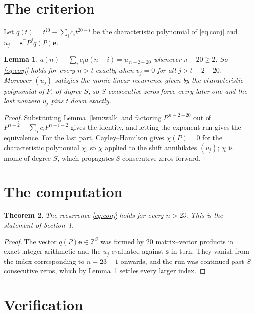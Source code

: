\documentclass[11pt,a4paper]{article}
\theoremstyle{plain}
\newtheorem{theorem}{Theorem}
\newtheorem{lemma}[theorem]{Lemma}
\theoremstyle{definition}
\begin{document}
\section{The criterion}

Let $q(t)=t^{20}-\sum_i c_i t^{20-i}$ be the characteristic polynomial of
\eqref{eq:conj} and $u_j=\mathbf{s}^{\!\top}P^{j}q(P)\mathbf{e}$.

\begin{lemma}\label{lem:crit}
$a(n)-\sum_i c_i a(n-i)=u_{\,n-2-20}$ whenever $n-20\ge2$. So \eqref{eq:conj}
holds for every $n>t$ exactly when $u_j=0$ for all $j>t-2-20$. Moreover $(u_j)$
satisfies the monic linear recurrence given by the characteristic polynomial of $P$, of
degree $S$, so $S$ consecutive zeros force every later one and the last nonzero $u_j$ pins
$t$ down exactly.
\end{lemma}

\begin{proof}
Substituting Lemma~\ref{lem:walk} and factoring $P^{\,n-2-20}$ out of
$P^{n-2}-\sum_i c_i P^{n-i-2}$ gives the identity, and letting the exponent run gives the
equivalence. For the last part, Cayley--Hamilton gives $\chi(P)=0$ for the characteristic
polynomial $\chi$, so $\chi$ applied to the shift annihilates $(u_j)$; $\chi$ is monic of
degree $S$, which propagates $S$ consecutive zeros forward.
\end{proof}

\section{The computation}

\begin{theorem}
The recurrence \eqref{eq:conj} holds for every $n>23$. This is the statement of
Section~1.
\end{theorem}

\begin{proof}
The vector $q(P)\mathbf{e}\in\mathbb{Z}^{S}$ was formed by $20$ matrix--vector
products in exact integer arithmetic and the $u_j$ evaluated against $\mathbf{s}$ in turn.
They vanish from the index corresponding to $n=23+1$ onwards, and the run was continued
past $S$ consecutive zeros, which by Lemma~\ref{lem:crit} settles every larger index.
\end{proof}

\section{Verification}
\end{document}
